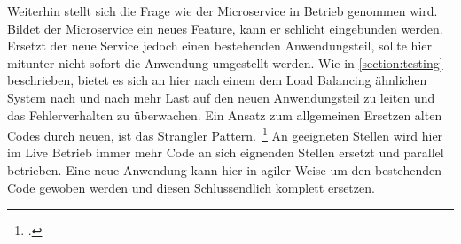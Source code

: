 Weiterhin stellt sich die Frage wie der Microservice in Betrieb genommen wird. Bildet der Microservice ein neues Feature, kann er schlicht eingebunden werden. Ersetzt der neue Service jedoch einen bestehenden Anwendungsteil, sollte hier mitunter nicht sofort die Anwendung umgestellt werden. Wie in \autoref{section:testing} beschrieben, bietet es sich an hier nach einem dem Load Balancing ähnlichen System nach und nach mehr Last auf den neuen Anwendungsteil zu leiten und das Fehlerverhalten zu überwachen.
Ein Ansatz zum allgemeinen Ersetzen alten Codes durch neuen, ist das Strangler Pattern.~\footcite[][]{Fowler:Strangler} An geeigneten Stellen wird hier im Live Betrieb immer mehr Code an sich eignenden Stellen ersetzt und parallel betrieben. Eine neue Anwendung kann hier in agiler Weise um den bestehenden Code gewoben werden und diesen Schlussendlich komplett ersetzen.
